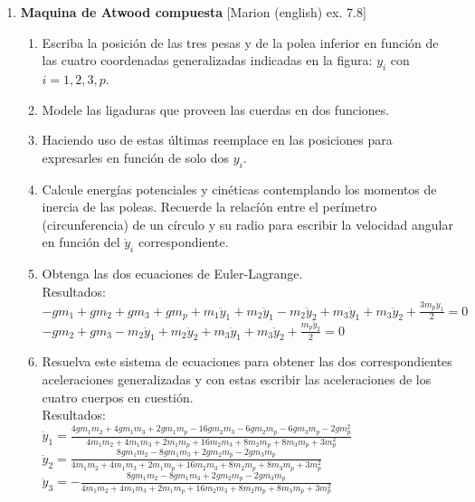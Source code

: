 \documentclass[11pt, spanish, a4paper, twoside]{article}
\begin{document}
\begin{enumerate}
\item
\begin{minipage}[t][10cm]{0.6\textwidth}
	\textbf{Maquina de Atwood compuesta} [Marion (english) ex. 7.8]\\ 
	\begin{enumerate}
		\item Escriba la posición de las tres pesas y de la polea inferior en función de 
		las cuatro coordenadas generalizadas indicadas en la figura: \(y_i\) con \(i = 1,2,3,p\). 
		\item Modele las ligaduras que proveen las cuerdas en dos funciones.
		\item Haciendo uso de estas últimas reemplace en las posiciones para expresarles en función de solo dos \(y_i\).
		\item Calcule energías potenciales y cinéticas contemplando los momentos de inercia de las poleas.
		Recuerde la relacíón entre el perímetro (circunferencia) de un círculo y su radio para escribir la velocidad angular en función del \(\dot{y}_i\) correspondiente.
		\item Obtenga las dos ecuaciones de Euler-Lagrange.\\
		Resultados:\\
		$- g m_{1} + g m_{2} + g m_{3} + g m_{p} + m_{1} \ddot{y}_{1} + m_{2} \ddot{y}_{1} - m_{2} \ddot{y}_{2} + m_{3} \ddot{y}_{1} + m_{3} \ddot{y}_{2} + \frac{3 m_{p} \ddot{y}_{1}}{2} = 0$\\
		$- g m_{2} + g m_{3} - m_{2} \ddot{y}_{1} + m_{2} \ddot{y}_{2} + m_{3} \ddot{y}_{1} + m_{3} \ddot{y}_{2} + \frac{m_{p} \ddot{y}_{2}}{2} = 0$
		\item Resuelva este sistema de ecuaciones para obtener las dos correspondientes aceleraciones generalizadas y con estas escribir las aceleraciones de los cuatro cuerpos en cuestión.\\
		Resultados:\\
		$\ddot{y}_{1} = \frac{4 g m_{1} m_{2} + 4 g m_{1} m_{3} + 2 g m_{1} m_{p} - 16 g m_{2} m_{3} - 6 g m_{2} m_{p} - 6 g m_{3} m_{p} - 2 g m_{p}^{2}}{4 m_{1} m_{2} + 4 m_{1} m_{3} + 2 m_{1} m_{p} + 16 m_{2} m_{3} + 8 m_{2} m_{p} + 8 m_{3} m_{p} + 3 m_{p}^{2}}$\\
		$\ddot{y}_{2} = \frac{8 g m_{1} m_{2} - 8 g m_{1} m_{3} + 2 g m_{2} m_{p} - 2 g m_{3} m_{p}}{4 m_{1} m_{2} + 4 m_{1} m_{3} + 2 m_{1} m_{p} + 16 m_{2} m_{3} + 8 m_{2} m_{p} + 8 m_{3} m_{p} + 3 m_{p}^{2}}$\\
		$\ddot{y}_{3} = - \frac{8 g m_{1} m_{2} - 8 g m_{1} m_{3} + 2 g m_{2} m_{p} - 2 g m_{3} m_{p}}{4 m_{1} m_{2} + 4 m_{1} m_{3} + 2 m_{1} m_{p} + 16 m_{2} m_{3} + 8 m_{2} m_{p} + 8 m_{3} m_{p} + 3 m_{p}^{2}}$\\

\end{enumerate}
\end{minipage}
\end{enumerate}
\end{document}
